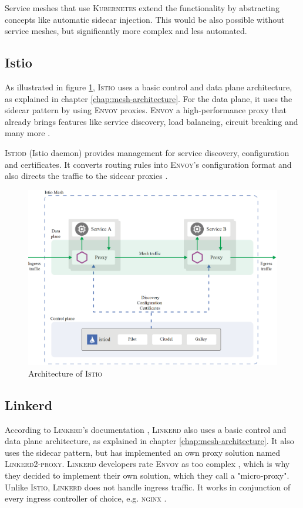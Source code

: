 Service meshes that use \textsc{Kubernetes} extend the functionality by abstracting concepts like automatic sidecar injection. This would be also possible without service meshes, but significantly more complex and less automated.

\subsection{Istio}

As illustrated in figure \ref{fig:arch-istio}, \textsc{Istio} uses a basic control and data plane architecture, as explained in chapter \ref{chap:mesh-architecture}. For the data plane, it uses the sidecar pattern by using \textsc{Envoy} proxies. \textsc{Envoy} a high-performance proxy that already brings features like service discovery, load balancing, circuit breaking and many more \cite{istio-docs-arch}.

\textsc{Istiod} (Istio daemon) provides management for service discovery, configuration and certificates. It converts routing rules into \textsc{Envoy}'s configuration format and also directs the traffic to the sidecar proxies \cite{istio-docs-arch}.

\begin{figure}
    \includegraphics[width=\columnwidth]{img/istio_architecture.png}
    \caption{Architecture of \textsc{Istio} \cite{istio-docs-arch}}
    \label{fig:arch-istio}
\end{figure}

\subsection{Linkerd}
\label{linkerd}
According to \textsc{Linkerd}'s documentation \cite{linkerd-docs-arch}, \textsc{Linkerd} also uses a basic control and data plane architecture, as explained in chapter \ref{chap:mesh-architecture}. It also uses the sidecar pattern, but has implemented an own proxy solution named \textsc{Linkerd2-proxy}. \textsc{Linkerd} developers rate \textsc{Envoy} as too complex \cite{linkerd-docs-no-envoy}, which is why they decided to implement their own solution, which they call a "micro-proxy". 
Unlike \textsc{Istio}, \textsc{Linkerd} does not handle ingress traffic. It works in conjunction of every ingress controller of choice, e.g. \textsc{nginx} \cite{linkerd-docs-faq}.

